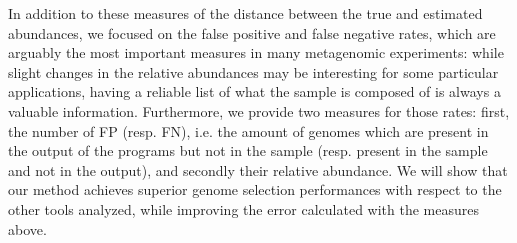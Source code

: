In addition to these measures of the distance between the true and estimated abundances, we focused on the false positive and false negative rates, which are arguably the most important measures in many metagenomic experiments: while slight changes in the relative abundances may be interesting for some particular applications, having a reliable list of what the sample is composed of is always a valuable information. Furthermore, we provide two measures for those rates: first, the number of FP (resp. FN), i.e. the amount of genomes which are present in the output of the programs but not in the sample (resp. present in the sample and not in the output), and secondly their relative abundance. We will show that our method achieves superior genome selection performances with respect to the other tools analyzed, while improving the error calculated with the measures above.

